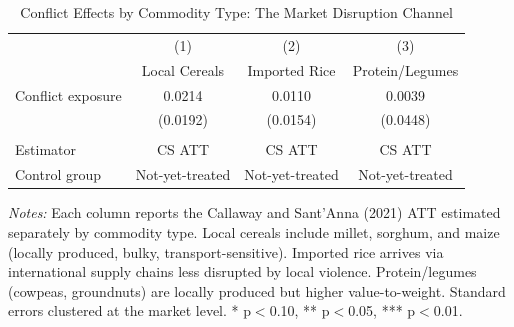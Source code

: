 \begin{table}[H]
\centering
\caption{Conflict Effects by Commodity Type: The Market Disruption Channel}
\label{tab:mechanism}
\begin{threeparttable}
\begin{tabular}{lccc}
\toprule
 & (1) & (2) & (3) \\
 & Local Cereals & Imported Rice & Protein/Legumes \\
\midrule
Conflict exposure & 0.0214 & 0.0110 & 0.0039 \\
 & (0.0192) & (0.0154) & (0.0448) \\
\\
Estimator & CS ATT & CS ATT & CS ATT \\
Control group & Not-yet-treated & Not-yet-treated & Not-yet-treated \\
\bottomrule
\end{tabular}
\begin{tablenotes}[flushleft]
\small
\item \textit{Notes:} Each column reports the Callaway and Sant'Anna (2021) ATT estimated separately by commodity type. Local cereals include millet, sorghum, and maize (locally produced, bulky, transport-sensitive). Imported rice arrives via international supply chains less disrupted by local violence. Protein/legumes (cowpeas, groundnuts) are locally produced but higher value-to-weight. Standard errors clustered at the market level. * p$<$0.10, ** p$<$0.05, *** p$<$0.01.
\end{tablenotes}
\end{threeparttable}
\end{table}
